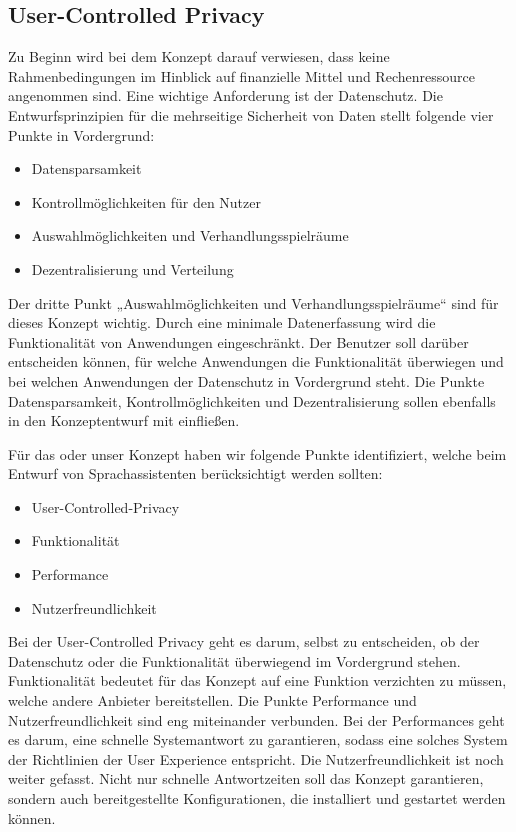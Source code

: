\subsection{User-Controlled Privacy}

Zu Beginn wird bei dem Konzept darauf verwiesen, dass keine Rahmenbedingungen im Hinblick auf finanzielle Mittel und Rechenressource angenommen sind.
Eine wichtige Anforderung ist der Datenschutz. Die Entwurfsprinzipien für die mehrseitige Sicherheit von Daten stellt folgende vier Punkte in Vordergrund\cite{kairannenberg}:

\begin{itemize}
\item Datensparsamkeit
\item Kontrollmöglichkeiten für den Nutzer 
\item Auswahlmöglichkeiten und Verhandlungsspielräume 
\item Dezentralisierung und Verteilung

\end{itemize}
Der dritte Punkt „Auswahlmöglichkeiten und Verhandlungsspielräume“ sind für dieses Konzept wichtig. Durch eine minimale Datenerfassung wird die Funktionalität von Anwendungen eingeschränkt. Der Benutzer soll darüber entscheiden können, für welche Anwendungen die Funktionalität überwiegen und bei welchen Anwendungen der Datenschutz in Vordergrund steht. Die Punkte Datensparsamkeit, Kontrollmöglichkeiten und Dezentralisierung sollen ebenfalls in den Konzeptentwurf mit einfließen.

Für das oder unser Konzept haben wir folgende Punkte identifiziert, welche beim Entwurf von Sprachassistenten berücksichtigt werden sollten:

\begin{itemize}
\item User-Controlled-Privacy
\item Funktionalität
\item Performance
\item Nutzerfreundlichkeit	
\end{itemize}

Bei der User-Controlled Privacy geht es darum, selbst zu entscheiden, ob der Datenschutz oder die Funktionalität überwiegend im Vordergrund stehen. Funktionalität bedeutet für das Konzept auf eine Funktion verzichten zu müssen, welche andere Anbieter bereitstellen. Die Punkte Performance und Nutzerfreundlichkeit sind eng miteinander verbunden. Bei der Performances geht es darum, eine schnelle Systemantwort zu garantieren, sodass eine solches System der Richtlinien der User Experience entspricht. Die Nutzerfreundlichkeit ist noch weiter gefasst. Nicht nur schnelle Antwortzeiten soll das Konzept garantieren, sondern auch bereitgestellte Konfigurationen, die installiert und gestartet werden können. 

